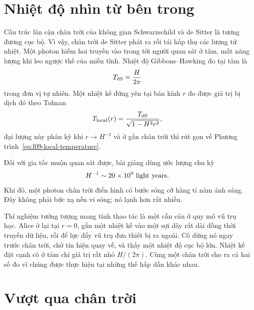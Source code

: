 \section{Nhiệt độ nhìn từ bên trong}

Cấu trúc lân cận chân trời của không gian Schwarzschild và de Sitter là tương đương cục bộ. Vì vậy, chân trời de Sitter phát ra rồi tái hấp thụ các lượng tử nhiệt. Một photon hiếm hoi truyền vào trong tới người quan sát ở tâm, mất năng lượng khi leo ngược thế của miền tĩnh. Nhiệt độ Gibbons--Hawking đo tại tâm là
\begin{equation}
T_{\rm dS}=\frac{H}{2\pi}
\label{eq:l09-de-sitter-temperature}
\end{equation}
trong đơn vị tự nhiên. Một nhiệt kế đứng yên tại bán kính \(r\) đo được giá trị bị dịch đỏ theo Tolman
\begin{equation}
T_{\rm local}(r)=
\frac{T_{\rm dS}}{\sqrt{1-H^2r^2}},
\label{eq:l09-tolman}
\end{equation}
đại lượng này phân kỳ khi \(r\to H^{-1}\) và ở gần chân trời thì rút gọn về Phương trình~\eqref{eq:l09-local-temperature}.


Đối với gia tốc muộn quan sát được, bài giảng dùng ước lượng chu kỳ
\begin{equation}
H^{-1}\sim 20\times10^9\ {\rm light\ years}.
\label{eq:l09-lecture-horizon-estimate}
\end{equation}
Khi đó, một photon chân trời điển hình có bước sóng cỡ hàng tỉ năm ánh sáng. Đây không phải bức xạ nền vi sóng; nó lạnh hơn rất nhiều.

Thí nghiệm tưởng tượng mang tính thao tác là một cần câu ở quy mô vũ trụ học. Alice ở lại tại \(r=0\), gắn một nhiệt kế vào một sợi dây rất dài đồng thời truyền dữ liệu, rồi để lực đẩy vũ trụ đưa thiết bị ra ngoài. Cô dừng nó ngay trước chân trời, chờ tín hiệu quay về, và thấy một nhiệt độ cục bộ lớn. Nhiệt kế đặt cạnh cô ở tâm chỉ giá trị rất nhỏ \(H/(2\pi)\). Cùng một chân trời cho ra cả hai số đo vì chúng được thực hiện tại những thế hấp dẫn khác nhau.

\section{Vượt qua chân trời}

